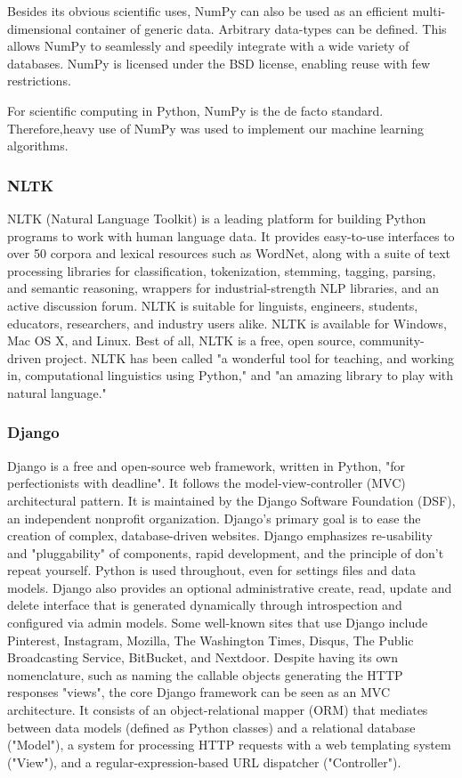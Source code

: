 Besides its obvious scientific uses, NumPy can also be used as an efficient multi-dimensional container of generic data. Arbitrary data-types can be defined. This allows NumPy to seamlessly and speedily integrate with a wide variety of databases.  NumPy is licensed under the BSD license, enabling reuse with few restrictions.

For scientific computing in Python, NumPy is the de facto standard. Therefore,heavy use of NumPy was used to implement our machine learning algorithms.

\subsubsection{NLTK}
NLTK (Natural Language Toolkit) is a leading platform for building Python
programs to work with human language data. It provides easy-to-use interfaces to
over 50 corpora and lexical resources such as WordNet, along with a suite of
text processing libraries for classification, tokenization, stemming, tagging,
parsing, and semantic reasoning, wrappers for industrial-strength NLP libraries,
and an active discussion forum. NLTK is suitable for linguists, engineers,
students, educators, researchers, and industry users alike. NLTK is available
for Windows, Mac OS X, and Linux. Best of all, NLTK is a free, open source,
community-driven project. NLTK has been called "a wonderful tool for teaching,
and working in, computational linguistics using Python," and "an amazing library
to play with natural language."

\subsubsection{Django}
Django is a free and open-source web framework, written in Python, "for
perfectionists with deadline". It follows the model-view-controller (MVC)
architectural pattern. It is maintained by the Django Software Foundation (DSF),
an independent nonprofit organization. Django's primary goal is to ease the
creation of complex, database-driven websites. Django emphasizes re-usability
and "pluggability" of components, rapid development, and the principle of don't
repeat yourself. Python is used throughout, even for settings files and data
models. Django also provides an optional administrative create, read, update and
delete interface that is generated dynamically through introspection and
configured via admin models. Some well-known sites that use Django include
Pinterest, Instagram, Mozilla, The Washington Times, Disqus, The Public
Broadcasting Service, BitBucket, and Nextdoor. Despite having its own
nomenclature, such as naming the callable objects generating the HTTP responses
"views", the core Django framework can be seen as an MVC architecture. It
consists of an object-relational mapper (ORM) that mediates between data models
(defined as Python classes) and a relational database ("Model"), a system for
processing HTTP requests with a web templating system ("View"), and a
regular-expression-based URL dispatcher ("Controller").

